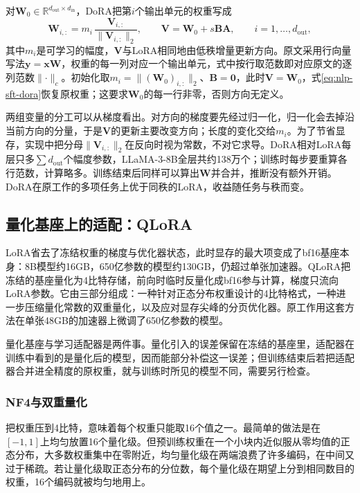 对$\bm W_0\in\mathbb R^{d_{\mathrm{out}}\times d_{\mathrm{in}}}$，DoRA把第$i$个输出单元的权重写成
\begin{equation}
 \bm W_{i,:}=m_i\,
 \frac{\bm{V}_{i,:}}{\lVert\bm{V}_{i,:}\rVert_2},
 \qquad \bm{V}=\bm{W}_0+s\bm{B}\bm{A},\qquad i=1,\ldots,d_{\mathrm{out}},
 \label{eq:nlp-sft-dora}
\end{equation}
其中$m_i$是可学习的幅度，$\bm V$与LoRA相同地由低秩增量更新方向。原文采用行向量写法$\bm y=\bm x\bm W$，权重的每一列对应一个输出单元，式中按行取范数即对应原文的逐列范数$\lVert\cdot\rVert_c$。初始化取$m_i=\lVert(\bm W_0)_{i,:}\rVert_2$、$\bm B=\bm 0$，此时$\bm V=\bm W_0$，式\eqref{eq:nlp-sft-dora}恢复原权重；这要求$\bm W_0$的每一行非零，否则方向无定义。

两组变量的分工可以从梯度看出。对方向的梯度要先经过归一化，归一化会去掉沿当前方向的分量，于是$\bm V$的更新主要改变方向；长度的变化交给$m_i$。为了节省显存，实现中把分母$\lVert\bm V_{i,:}\rVert_2$在反向时视为常数，不对它求导。DoRA相对LoRA每层只多$\sum d_{\mathrm{out}}$个幅度参数，LLaMA-3-8B全层共约138万个；训练时每步要重算各行范数，计算略多。训练结束后同样可以算出$\bm W$并合并，推断没有额外开销。DoRA在原工作的多项任务上优于同秩的LoRA，收益随任务与秩而变。

\subsection{量化基座上的适配：QLoRA}
\label{sec:nlp-sft-qlora}

LoRA省去了冻结权重的梯度与优化器状态，此时显存的最大项变成了bf16基座本身：8B模型约16GB，650亿参数的模型约130GB，仍超过单张加速器。QLoRA把冻结的基座量化为4比特存储，前向时临时反量化成bf16参与计算，梯度只流向LoRA参数。它由三部分组成：一种针对正态分布权重设计的4比特格式，一种进一步压缩量化常数的双重量化，以及应对显存尖峰的分页优化器。原工作用这套方法在单张48GB的加速器上微调了650亿参数的模型。

量化基座与学习适配器是两件事。量化引入的误差保留在冻结的基座里，适配器在训练中看到的是量化后的模型，因而能部分补偿这一误差；但训练结束后若把适配器合并进全精度的原权重，就与训练时所见的模型不同，需要另行检查。

\subsubsection{NF4与双重量化}
\label{sec:nlp-sft-nf4}

把权重压到4比特，意味着每个权重只能取16个值之一。最简单的做法是在$[-1,1]$上均匀放置16个量化级。但预训练权重在一个小块内近似服从零均值的正态分布，大多数权重集中在零附近，均匀量化级在两端浪费了许多编码，在中间又过于稀疏。若让量化级取正态分布的分位数，每个量化级在期望上分到相同数目的权重，16个编码就被均匀地用上。

